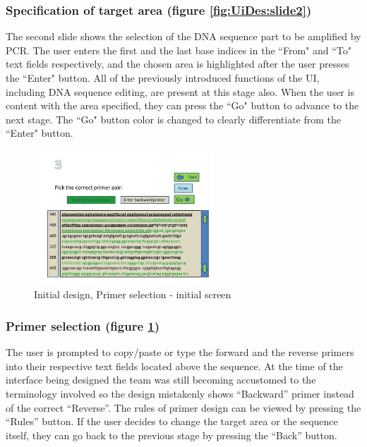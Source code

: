 \subsubsection{Specification of target area (figure \ref{fig:UiDes:slide2})}
The second slide shows the selection of the DNA sequence part to be
amplified by PCR.
The user enters the first and the last base indices in the ``From" and
``To" text fields respectively, and the chosen area is highlighted
after the user presses the ``Enter" button.
All of the previously introduced functions of the UI, including DNA
sequence editing, are present at this stage also.
When the user is content with the area specified, they can press the
``Go" button to advance to the next stage.
The ``Go" button color is changed to clearly differentiate from the
``Enter" button.

\begin{figure}[h]
  \begin{center}
	\includegraphics[width=0.6\textwidth]{./images/UiDes/slide3.jpg}
    \caption{
      \label{fig:UiDes:slide3}
      Initial design, Primer selection - initial screen
    }
  \end{center}
\end{figure}


\subsubsection{Primer selection (figure \ref{fig:UiDes:slide3})}

The user is prompted to copy/paste or type the forward and the reverse
primers into their respective text fields located above the sequence.
At the time of the interface being designed the team was still
becoming accustomed to the terminology involved so the design
mistakenly shows ``Backward'' primer instead of the correct
``Reverse''.
The rules of primer design can be viewed by pressing the ``Rules''
button.
If the user decides to change the target area or the sequence itself,
they can go back to the previous stage by pressing the ``Back'' button. 



